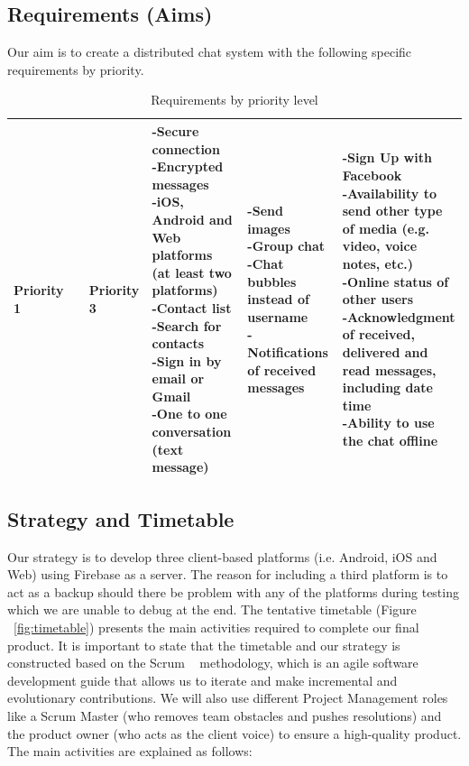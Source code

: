 
\subsection{Requirements (Aims)}

Our aim is to create a distributed chat system with the following specific requirements by  priority.

\begin{table}[ht]
\caption{Requirements by priority level}
\label{tab:requirements}
    \begin{tabular}[c]{ | p{5cm} | p{5cm} | p{5cm} |}
		\hline
		\centering\textbf{Priority 1} &  & \centering\textbf{Priority 3} &
    \hline
    \parbox[t]{5cm}{-Secure connection\\-Encrypted messages\\ -iOS, Android and Web platforms (at least two platforms)\\ -Contact list\\ -Search for contacts\\ -Sign in by email or Gmail \\ -One to one conversation (text message)} &  \parbox[t]{5cm}{-Send images\\ -Group chat\\ -Chat bubbles instead of username\\ -Notifications of received messages}
& \parbox[t]{5cm}{-Sign Up with Facebook\\ -Availability to send other type of media (e.g. video, voice notes, etc.)\\ -Online status of other users\\ -Acknowledgment of received, delivered and read messages, including date time\\ -Ability to use the chat offline}\\
    \hline
    \end{tabular}
\end{table}


\subsection{Strategy and Timetable}

Our strategy is to develop three client-based platforms (i.e. Android, iOS and Web) using Firebase as a server. The reason for including a third platform is to act as a backup should there be problem with any of the platforms during testing which we are unable to debug at the end. The tentative timetable (Figure ~\ref{fig:timetable}) presents the main activities required to complete our final product. It is important to state that the timetable and our strategy is constructed based on the Scrum ~\cite{scrum} methodology, which  is an agile software development guide that allows us to iterate and make incremental and evolutionary contributions.  We will also use different Project Management roles like a Scrum Master (who removes team obstacles and pushes resolutions) and the product owner (who acts as the client voice) to ensure a high-quality product. The main activities are explained as follows: 

